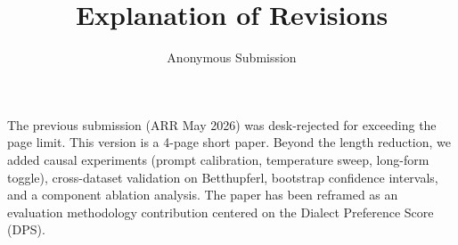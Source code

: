 \documentclass[11pt,a4paper]{article}
\title{Explanation of Revisions}
\author{Anonymous Submission}
\date{}
\begin{document}
\maketitle

The previous submission (ARR May 2026) was desk-rejected for exceeding the page limit. This version is a 4-page short paper. Beyond the length reduction, we added causal experiments (prompt calibration, temperature sweep, long-form toggle), cross-dataset validation on Betthupferl, bootstrap confidence intervals, and a component ablation analysis. The paper has been reframed as an evaluation methodology contribution centered on the Dialect Preference Score (DPS).
\end{document}

